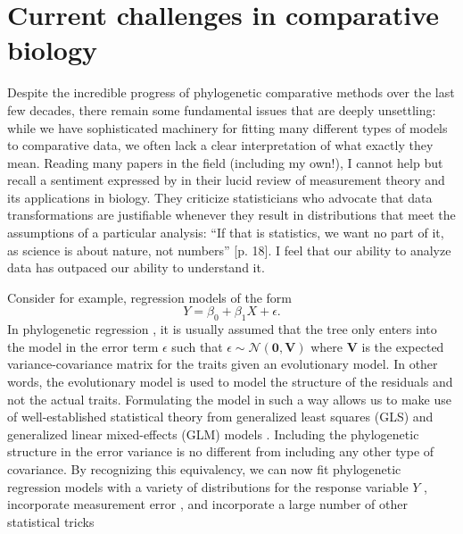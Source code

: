 \section{Current challenges in comparative biology}

Despite the incredible progress of phylogenetic comparative methods over the last few decades, there remain some fundamental issues that are deeply unsettling: while we have sophisticated machinery for fitting many different types of models to comparative data, we often lack a clear interpretation of what exactly they mean. Reading many papers in the field (including my own!), I cannot help but recall a sentiment expressed by \citet{Houle2011} in their lucid review of measurement theory and its applications in biology. They criticize statisticians who advocate that data transformations are justifiable whenever they result in distributions that meet the assumptions of a particular analysis: ``If that is statistics, we want no part of it, as science is about nature, not numbers'' [p. 18]. I feel that our ability to analyze data has outpaced our ability to understand it.

Consider for example, regression models of the form
\[Y=\beta_0 + \beta_1X + \epsilon.\]
In phylogenetic regression \citep{Grafen1989, Lynch1991}, it is usually assumed that the tree only enters into the model in the error term $\epsilon$ such that $\epsilon \sim \mathcal{N}(\mathbf{0}, \mathbf{V})$ where $\mathbf{V}$ is the expected variance-covariance matrix for the traits given an evolutionary model. In other words, the evolutionary model is used to model the structure of the residuals and not the actual traits. Formulating the model in such a way allows us to make use of well-established statistical theory from generalized least squares (GLS) and generalized linear mixed-effects (GLM) models \citep{Lynch1991, Rohlf2001, Rohlf2006, Hadfield2010}. Including the phylogenetic structure in the error variance is no different from including any other type of covariance. By recognizing this equivalency, we can now fit phylogenetic regression models with a variety of distributions for the response variable $Y$ \citep{Ives2010, Hadfield2010}, incorporate measurement error \citep{Ives2007, Hansen2012SysBio}, and incorporate a large number of other statistical tricks \citep[see][for a recent review]{PCM}

